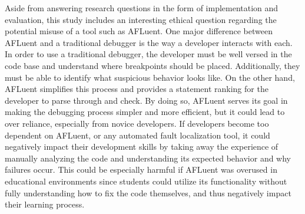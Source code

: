 Aside from answering research questions in the form of implementation and
evaluation, this study includes an interesting ethical question regarding the
potential misuse of a tool such as AFLuent. One major difference between AFLuent
and a traditional debugger is the way a developer interacts with each. In order
to use a traditional debugger, the developer must be well versed in the code
base and understand where breakpoints should be placed. Additionally, they must
be able to identify what suspicious behavior looks like. On the other hand,
AFLuent simplifies this process and provides a statement ranking for the
developer to parse through and check. By doing so, AFLuent serves its goal in
making the debugging process simpler and more efficient, but it could lead to
over reliance, especially from novice developers. If developers become too
dependent on AFLuent, or any automated fault localization tool, it could
negatively impact their development skills by taking away the experience of
manually analyzing the code and understanding its expected behavior and why
failures occur. This could be especially harmful if AFLuent was overused in
educational environments since students could utilize its functionality without
fully understanding how to fix the code themselves, and thus negatively impact
their learning process.

